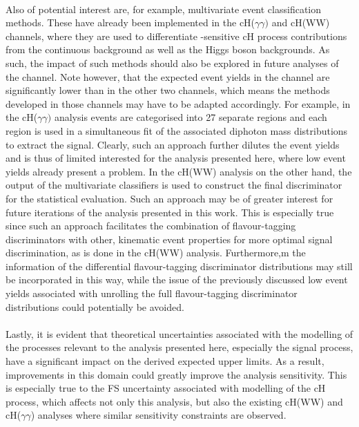 \\
Also of potential interest are, for example, multivariate event classification methods. These have already been implemented in the cH($\gamma\gamma)$ and cH(WW) channels, where they are used to differentiate \kappac-sensitive cH process contributions from the continuous background as well as the Higgs boson backgrounds. As such, the impact of such methods should also be explored in future analyses of the \cHZZ channel. Note however, that the expected event yields in the \cHZZ channel are significantly lower than in the other two channels, which means the methods developed in those channels may have to be adapted accordingly. For example, in the cH($\gamma\gamma)$ analysis events are categorised into 27 separate regions and each region is used in a simultaneous fit of the associated diphoton mass distributions to extract the signal. Clearly, such an approach further dilutes the event yields and is thus of limited interested for the analysis presented here, where low event yields already present a problem. In the cH(WW) analysis on the other hand, the output of the multivariate classifiers is used to construct the final discriminator for the statistical evaluation. Such an approach may be of greater interest for future iterations of the analysis presented in this work. This is especially true since such an approach facilitates the combination of flavour-tagging discriminators with other, kinematic event properties for more optimal signal discrimination, as is done in the cH(WW) analysis. Furthermore,m the information of the differential flavour-tagging discriminator distributions may still be incorporated in this way, while the issue of the previously discussed low event yields associated with unrolling the full flavour-tagging discriminator distributions could potentially be avoided.\\
\\
Lastly, it is evident that theoretical uncertainties associated with the modelling of the processes relevant to the analysis presented here, especially the signal process, have a significant impact on the derived expected upper limits. As a result, improvements in this domain could greatly improve the analysis sensitivity. This is especially true to the FS uncertainty associated with modelling of the cH process, which affects not only this analysis, but also the existing cH(WW) and cH($\gamma\gamma$) analyses where similar sensitivity constraints are observed. \\
\\

